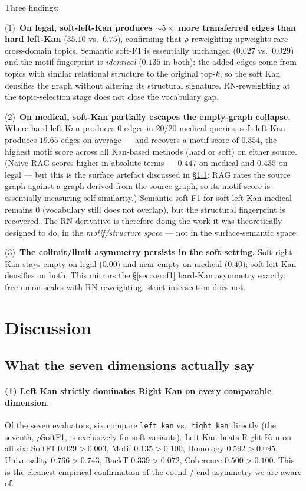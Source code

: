 \documentclass[10pt,letterpaper]{article}
\begin{document}
Three findings:

(1)~\textbf{On legal, soft-left-Kan produces ${\sim}5{\times}$ more transferred edges than hard left-Kan} ($35.10$ vs.\ $6.75$), confirming that $\rho$-reweighting upweights rare cross-domain topics. Semantic soft-F1 is essentially unchanged ($0.027$ vs.\ $0.029$) and the motif fingerprint is \emph{identical} ($0.135$ in both): the added edges come from topics with similar relational structure to the original top-$k$, so the soft Kan densifies the graph without altering its structural signature. RN-reweighting at the topic-selection stage does not close the vocabulary gap.

(2)~\textbf{On medical, soft-Kan partially escapes the empty-graph collapse.} Where hard left-Kan produces $0$ edges in $20/20$ medical queries, soft-left-Kan produces $19.65$ edges on average --- and recovers a motif score of $\mathbf{0.354}$, the highest motif score across all Kan-based methods (hard or soft) on either source. (Naive RAG scores higher in absolute terms --- $0.447$ on medical and $0.435$ on legal --- but this is the surface artefact discussed in \S\ref{sec:5-1}: RAG rates the source graph against a graph derived from the source graph, so its motif score is essentially measuring self-similarity.) Semantic soft-F1 for soft-left-Kan medical remains $0$ (vocabulary still does not overlap), but the structural fingerprint is recovered. The RN-derivative is therefore doing the work it was theoretically designed to do, in the \emph{motif/structure space} --- not in the surface-semantic space.

(3)~\textbf{The colimit/limit asymmetry persists in the soft setting.} Soft-right-Kan stays empty on legal ($0.00$) and near-empty on medical ($0.40$); soft-left-Kan densifies on both. This mirrors the \S\ref{sec:zerof1} hard-Kan asymmetry exactly: free union scales with RN reweighting, strict intersection does not.

\section{Discussion}

\subsection{What the seven dimensions actually say}\label{sec:5-1}

\paragraph{(1) Left Kan strictly dominates Right Kan on every comparable dimension.} Of the seven evaluators, six compare \texttt{left\_kan} vs.\ \texttt{right\_kan} directly (the seventh, $\rho$SoftF1, is exclusively for soft variants). Left Kan beats Right Kan on all six: SoftF1 $0.029{>}0.003$, Motif $0.135{>}0.100$, Homology $0.592{>}0.095$, Universality $0.766{>}0.743$, BackT $0.339{>}0.072$, Coherence $0.500{>}0.100$. This is the cleanest empirical confirmation of the coend / end asymmetry we are aware of.
\end{document}
